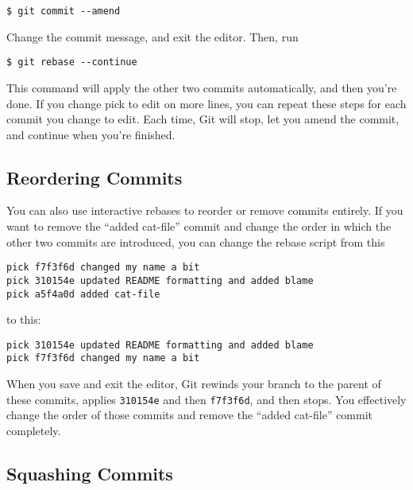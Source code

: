 \documentclass[a4paper]{book}
\begin{document}
\begin{shaded}\begin{verbatim}
$ git commit --amend
\end{verbatim}\end{shaded}

Change the commit message, and exit the editor. Then, run

\begin{shaded}\begin{verbatim}
$ git rebase --continue
\end{verbatim}\end{shaded}

This command will apply the other two commits automatically, and then you're done. If you change pick to edit on more lines, you can repeat these steps for each commit you change to edit. Each time, Git will stop, let you amend the commit, and continue when you're finished.

\subsection{Reordering Commits}

You can also use interactive rebases to reorder or remove commits entirely. If you want to remove the “added cat-file” commit and change the order in which the other two commits are introduced, you can change the rebase script from this

\begin{shaded}\begin{verbatim}
pick f7f3f6d changed my name a bit
pick 310154e updated README formatting and added blame
pick a5f4a0d added cat-file
\end{verbatim}\end{shaded}

to this:

\begin{shaded}\begin{verbatim}
pick 310154e updated README formatting and added blame
pick f7f3f6d changed my name a bit
\end{verbatim}\end{shaded}

When you save and exit the editor, Git rewinds your branch to the parent of these commits, applies \texttt{310154e} and then \texttt{f7f3f6d}, and then stops. You effectively change the order of those commits and remove the “added cat-file” commit completely.

\subsection{Squashing Commits}
\end{document}
